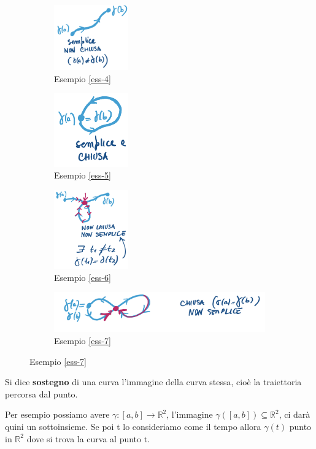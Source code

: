 \begin{figure}[h!]
\centering
\begin{subfigure}{.3\textwidth}
    \centering
    \includegraphics[width=3.2cm]{images/curva-semplice-non-chiusa.png}
    \caption{Esempio \ref{ess-4}}
\end{subfigure}
\begin{subfigure}{.3\textwidth}
    \centering
    \includegraphics[width=3.2cm]{images/semplice-chiusa.png}
    \caption{Esempio \ref{ess-5}}
\end{subfigure}
\begin{subfigure}{.3\textwidth}
    \centering
    \includegraphics[width=3.2cm]{images/non-chiusa-non-semplice.png}
    \caption{Esempio \ref{ess-6}}
\end{subfigure}
\begin{subfigure}{.5\textwidth}
    \centering
    \vspace{20pt}
    \includegraphics[width=10cm]{images/chiusa-non-semplice.png}
    \caption{Esempio \ref{ess-7}}
\end{subfigure}
\end{figure}

\begin{definition}
Si dice \textbf{sostegno} di una curva l'immagine della curva stessa, cioè la traiettoria percorsa dal punto. 
\end{definition}
\hspace{-15pt}Per esempio possiamo avere $\gamma: [a,b] \to \mathbb{R}^2$, l'immagine $\gamma([a,b]) \subseteq \mathbb{R}^2$, ci darà quini un sottoinsieme. Se poi t lo consideriamo come il tempo allora $\gamma(t)$ punto in $\mathbb{R}^2$ dove si trova la curva al punto t.

